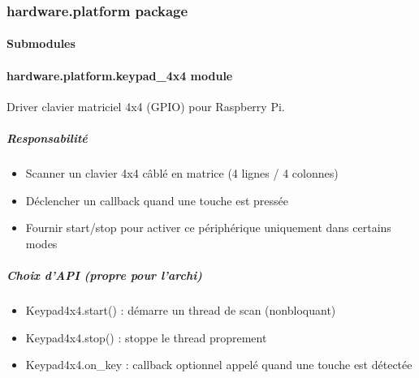 \documentclass[letterpaper,10pt,french]{sphinxmanual}
\begin{document}
\subsubsection{hardware.platform package}
\label{\detokenize{api/hardware.platform:hardware-platform-package}}\label{\detokenize{api/hardware.platform::doc}}

\paragraph{Submodules}
\label{\detokenize{api/hardware.platform:submodules}}

\paragraph{hardware.platform.keypad\_4x4 module}
\label{\detokenize{api/hardware.platform:module-hardware.platform.keypad_4x4}}\label{\detokenize{api/hardware.platform:hardware-platform-keypad-4x4-module}}
\sphinxAtStartPar
Driver clavier matriciel 4x4 (GPIO) pour Raspberry Pi.


\subparagraph{Responsabilité}
\label{\detokenize{api/hardware.platform:responsabilite}}\begin{itemize}
\item {} 
\sphinxAtStartPar
Scanner un clavier 4x4 câblé en matrice (4 lignes / 4 colonnes)

\item {} 
\sphinxAtStartPar
Déclencher un callback quand une touche est pressée

\item {} 
\sphinxAtStartPar
Fournir start/stop pour activer ce périphérique uniquement dans certains modes

\end{itemize}


\subparagraph{Choix d’API (propre pour l’archi)}
\label{\detokenize{api/hardware.platform:choix-d-api-propre-pour-l-archi}}\begin{itemize}
\item {} 
\sphinxAtStartPar
Keypad4x4.start()  : démarre un thread de scan (non\sphinxhyphen{}bloquant)

\item {} 
\sphinxAtStartPar
Keypad4x4.stop()   : stoppe le thread proprement

\item {} 
\sphinxAtStartPar
Keypad4x4.on\_key   : callback optionnel appelé quand une touche est détectée

\end{itemize}
\end{document}
